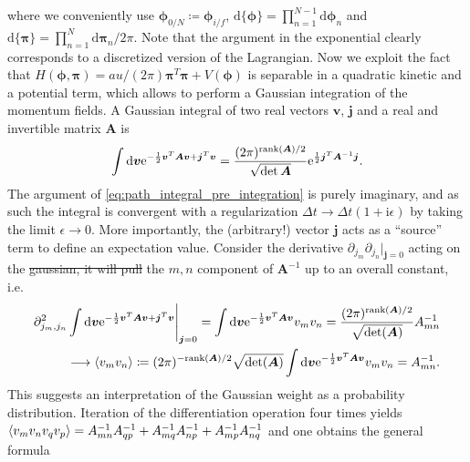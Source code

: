 \documentclass{svmono}
\def\ri{\mathrm i}
\def\re{\mathrm e}
\def\rd{\mathrm d}
\providecommand{\DIFaddtex}[1]{{\protect\color{blue}\uwave{#1}}} %
\providecommand{\DIFdeltex}[1]{{\protect\color{red}\sout{#1}}}                      %
\providecommand{\DIFaddbegin}{} %
\providecommand{\DIFaddend}{} %
\providecommand{\DIFdelbegin}{} %
\providecommand{\DIFdelend}{} %
\providecommand{\DIFadd}[1]{\texorpdfstring{\DIFaddtex{#1}}{#1}} %
\providecommand{\DIFdel}[1]{\texorpdfstring{\DIFdeltex{#1}}{}} %
\newcommand{\DIFscaledelfig}{0.5}
\newlength{\DIFdelgraphicswidth} %
\newlength{\DIFdelgraphicsheight} %
\newcommand{\DIFaddincludegraphics}[2][]{{\color{blue}\fbox{\DIFOincludegraphics[#1]{#2}}}} %
\newcommand{\DIFdelincludegraphics}[2][]{%
\sbox{\DIFdelgraphicsbox}{\DIFOincludegraphics[#1]{#2}}%
\settoboxwidth{\DIFdelgraphicswidth}{\DIFdelgraphicsbox} %
\settoboxtotalheight{\DIFdelgraphicsheight}{\DIFdelgraphicsbox} %
\scalebox{\DIFscaledelfig}{%
\parbox[b]{\DIFdelgraphicswidth}{\usebox{\DIFdelgraphicsbox}\\[-\baselineskip] \rule{\DIFdelgraphicswidth}{0em}}\llap{\resizebox{\DIFdelgraphicswidth}{\DIFdelgraphicsheight}{%
\setlength{\unitlength}{\DIFdelgraphicswidth}%
\begin{picture}(1,1)%
\thicklines\linethickness{2pt} %
{\color[rgb]{1,0,0}\put(0,0){\framebox(1,1){}}}%
{\color[rgb]{1,0,0}\put(0,0){\line( 1,1){1}}}%
{\color[rgb]{1,0,0}\put(0,1){\line(1,-1){1}}}%
\end{picture}%
}\hspace*{3pt}}} %
} %
\DeclareRobustCommand{\DIFaddbegin}{\DIFOaddbegin \let\includegraphics\DIFaddincludegraphics} %
\DeclareRobustCommand{\DIFaddend}{\DIFOaddend \let\includegraphics\DIFOincludegraphics} %
\DeclareRobustCommand{\DIFdelbegin}{\DIFOdelbegin \let\includegraphics\DIFdelincludegraphics} %
\DeclareRobustCommand{\DIFdelend}{\DIFOaddend \let\includegraphics\DIFOincludegraphics} %
\begin{document}
where we conveniently use $\bm\phi_{0/N}\coloneqq \bm\phi_{i/f}$, $\rd\{\bm\phi\}=\prod_{n=1}^{N-1}\rd\bm\phi_n$ and $\rd\{\bm\pi\}=\prod_{n=1}^N\rd\bm\pi_n/2\pi$.
Note that the argument in the exponential clearly corresponds to a discretized version of the Lagrangian.
Now we exploit the fact that $H(\bm\phi,\bm\pi)=au/(2\pi)\bm\pi^T\bm\pi + V(\bm\phi)$ is separable in a quadratic kinetic and a potential term, which allows to perform a Gaussian integration of the momentum fields.
A Gaussian integral of two real vectors $\bm v$, $\bm j$ and a real and invertible matrix $\bm A$ is
\begin{align}
    \int\rd\bm v\re^{-\frac12\bm v^T\bm A\bm v + \bm j^T\bm v} = \frac{(2\pi)^{{\rm rank}(\bm A)/2}}{\sqrt{\det\bm A}}\re^{\frac12\bm j^T\bm A^{-1}\bm j}.
    \label{eq:multi_gaussian}
\end{align}
The argument of \cref{eq:path_integral_pre_integration} is purely imaginary, and as such the integral is convergent with a regularization $\Delta t\rightarrow\Delta t(1+\ri\epsilon)$ by taking the limit $\epsilon\rightarrow0$.
More importantly, the (arbitrary!) vector $\bm j$ acts as a ``source'' term to define an expectation value.
Consider the derivative $\partial_{j_m}\partial_{j_n}|_{\bm j=0}$ acting on the \DIFdelbegin \DIFdel{gaussian, it will pull }\DIFdelend \DIFaddbegin \DIFadd{Gaussian, which targets }\DIFaddend the $m,n$ component of $\bm A^{-1}$ up to an overall constant, i.e.
\begin{align}
    \partial^2_{j_m,j_n}\int\rd\bm v\re^{-\frac12\bm v^T\bm A\bm v + \bm j^T \bm v}\Bigg|_{\bm j=0}
    =
    \int\rd\bm v\re^{-\frac12\bm v^T\bm A\bm v}v_mv_n
    =
    \frac{(2\pi)^{{\rm rank}(\bm A)/2}}{\sqrt{\det(\bm A)}}A^{-1}_{mn}
    \\
    \longrightarrow \braket{v_mv_n}\coloneqq (2\pi)^{-{\rm rank}(\bm A)/2}\sqrt{\det(\bm A)}\int\rd\bm v\re^{-\frac12\bm v^T\bm A\bm v}v_mv_n = A_{mn}^{-1}.
    \label{eq:multi_source}
\end{align}
This suggests an interpretation of the Gaussian weight as a probability distribution.
Iteration of the differentiation operation four times yields $\braket{v_mv_nv_qv_p}=A^{-1}_{mn}A^{-1}_{qp}+A^{-1}_{mq}A^{-1}_{np}+A^{-1}_{mp}A^{-1}_{nq}$ and one obtains the general formula
\DIFdelbegin %
\end{document}
